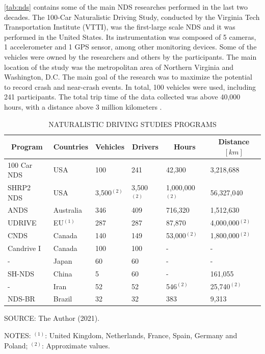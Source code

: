 \autoref{tab:nds} contains some of the main NDS researches performed in the last two decades. The 100-Car Naturalistic Driving Study, conducted by the Virginia Tech Transportation Institute (VTTI), was the first-large scale NDS and it was performed in the United States. Its instrumentation was composed of 5 cameras, 1 accelerometer and 1 GPS sensor, among other monitoring devices. Some of the vehicles were owned by the researchers and others by the participants. The main location of the study was the metropolitan area of Northern Virginia and Washington, D.C. The main goal of the research was to maximize the potential to record crash and near-crash events. In total, 100 vehicles were used, including 241 participants. The total trip time of the data collected was above 40,000 hours, with a distance above 3 million kilometers \cite{Neale2005}.

\begin{table}[!hbtp]
    \footnotesize
    \captionsetup{justification=raggedright,
        singlelinecheck=false,
        font=footnotesize}
    \caption{NATURALISTIC DRIVING STUDIES PROGRAMS}
    \centering
    \begin{tabular}{llllll}
        \hline
        \multicolumn{1}{c}{\textbf{Program}} & \multicolumn{1}{c}{\textbf{Countries}} & \multicolumn{1}{c}{\textbf{Vehicles}} & \multicolumn{1}{c}{\textbf{Drivers}} & \multicolumn{1}{c}{\textbf{Hours}} & \multicolumn{1}{c}{\textbf{Distance} $[km]$} \\
        \hline
        100 Car NDS & USA        & 100 & 241 & 42,300 & 3,218,688 \\
        SHRP2 NDS   & USA        & 3,500$^{(2)}$ & 3,500$^{(2)}$ & 1,000,000$^{(2)}$ & 56,327,040 \\
        ANDS        & Australia  & 346 & 409 & 716,320 & 1,512,630 \\
        UDRIVE      & EU$^{(1)}$ & 287 & 287 & 87,870 & 4,000,000$^{(2)}$ \\
        CNDS        & Canada     & 140 & 149 & 53,000$^{(2)}$ & 1,800,000$^{(2)}$ \\
        Candrive I  & Canada     & 100 & 100 & - & - \\
        -           & Japan      & 60  & 60  & - & - \\
        SH-NDS      & China      & 5   & 60  & - & 161,055 \\
        -           & Iran       & 52  & 52  & 546$^{(2)}$ & 25,740$^{(2)}$ \\
        NDS-BR      & Brazil     & 32  & 32  & 383 & 9,313 \\ 
        \hline
    \end{tabular}
    \label{tab:nds}
    \par \vspace{2mm} \footnotesize \raggedright
    SOURCE: The Author (2021).
    \par \vspace{1mm} \footnotesize \raggedright
    NOTES: $^{(1)}$: United Kingdom, Netherlands, France, Spain, Germany and Poland; $^{(2)}$: Approximate values.
\end{table}

